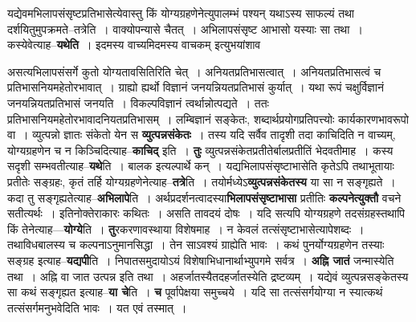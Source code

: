 \documentclass[article,12pt,a4paper]{memoir}
\begin{document}
	  \pstart यद्येवमभिलापसंसृष्टप्रतिभासेत्येवास्तु किं योग्यग्रहणेनेत्युपालम्भं पश्यन् यथाऽस्य साफल्यं तथा दर्शयितुमुपक्रमते--तत्रेति । वाक्योपन्यासे चैतत् । अभिलापसंसृष्ट आभासो यस्याः सा तथा । कस्येवेत्याह--\textbf{यथेति} । इदमस्य वाच्यमिदमस्य वाचकम् इत्युभयांशाव  \leavevmode{} 
	  
	असत्यभिलापसंसर्गे कुतो योग्यतावसितिरिति चेत् । अनियतप्रतिभासत्वात् । अनियतप्रतिभासत्वं च प्रतिभासनियमहेतोरभावात् । ग्राह्यो ह्यर्थो विज्ञानं जनयन्नियतप्रतिभासं कुर्यात् । यथा रूपं चक्षुर्विज्ञानं जनयन्नियतप्रतिभासं जनयति । विकल्पविज्ञानं त्वर्थान्नोत्पद्यते । ततः प्रतिभासनियमहेतोरभावादनियतप्रतिभासम् । लम्बिज्ञानं सङ्केतः, शब्दार्थप्रयोगप्रतिपत्त्योः कार्यकारणभावरूपो वा । व्युत्पन्नो ज्ञातः संकेतो येन स \textbf{व्युत्पन्नसंकेतः} । तस्य यदि सर्वैव तादृशी तदा काचिदिति न वाच्यम्, योग्यग्रहणेन च न किञ्चिदित्याह--\textbf{काचिद्} इति । \textbf{तुः} व्युत्पन्नसंकेतप्रतीतेर्बालप्रतीतिं भेदवतीमाह । कस्य सदृशी सम्भवतीत्याह--\textbf{यथे}ति । बालक इत्यल्पार्थे कन् । यद्यभिलापसंसृष्टाभासेति कृतेऽपि तथाभूतायाः प्रतीतेः सङ्ग्रहः, कृतं तर्हि योग्यग्रहणेनेत्याह--\textbf{तत्रे}ति । तयोर्मध्येऽ\textbf{व्युत्पन्नसंकेतस्य} या सा न सङ्गृह्यते । कदा तु सङ्गृह्यतेत्याह--\textbf{अभिलापे}ति । अर्थप्रदर्शनत्वादस्या\textbf{भिलापसंसृष्टाभासा} प्रतीतिः \textbf{कल्पनेत्युक्तौ} वचने सतीत्यर्थः । इतिनोक्तेराकारः कथितः । असति तावदयं दोषः । यदि सत्यपि योग्यग्रहणे तदसंग्रहस्तथापि किं तेनेत्याह—\textbf{योग्ये}ति । \textbf{तु}रकरणावस्थाया विशेषमाह । न केवलं तत्संसृष्टाभासेत्यापेशब्दः । तथाविधबालस्य च कल्पनाऽनुमानसिद्धा । तेन साऽवश्यं ग्राह्येति भावः । कथं पुनर्योग्यग्रहणेन तस्याः सङ्ग्रह इत्याह--\textbf{यद्यपी}ति । निपातसमुदायोऽयं विशेषाभिधानार्थाभ्युपगमे सर्वत्र । \textbf{अह्नि जातं} जन्मास्येति तथा । अह्नि वा जात उत्पन्न इति तथा । अहर्जातस्यैतदहर्जातस्येति द्रष्टव्यम् । यद्येवं व्युत्पन्नसङ्केतस्य सा कथं सङ्गृह्यत इत्याह--\textbf{या चे}ति । \textbf{च} पूर्वापेक्षया समुच्चये । यदि सा तत्संसर्गयोग्या न स्यात्कथं तत्संसर्गमनुभवेदिति भावः । यत एवं तस्मात् ।
	\pend
      
\end{document}
